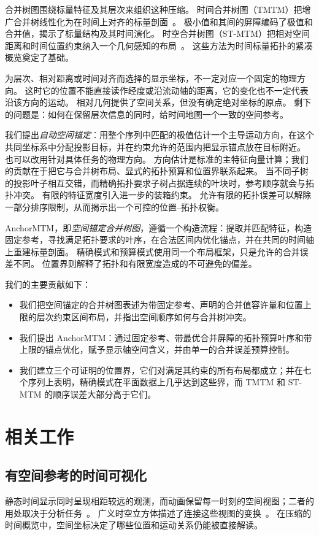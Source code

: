 \documentclass[fontset=none,zihao=5,a4paper]{ctexart}
\begin{document}
合并树图围绕标量特征及其层次来组织这种压缩。
时间合并树图（TMTM）把增广合并树线性化为在时间上对齐的标量剖面~\cite{Koepp:2023:TMTM}。
极小值和其间的屏障编码了极值和合并值，揭示了标量结构及其时间演化。
时空合并树图（ST-MTM）把相对空间距离和时间位置约束纳入一个几何感知的布局~\cite{STMTM:2026}。
这些方法为时间标量拓扑的紧凑概览奠定了基础。

为层次、相对距离或时间对齐而选择的显示坐标，不一定对应一个固定的物理方向。
这时它的位置不能直接读作经度或沿流动轴的距离，它的变化也不一定代表沿该方向的运动。
相对几何提供了空间关系，但没有确定绝对坐标的原点。
剩下的问题是：如何在保留层次信息的同时，给时间地图一个一致的空间参考。

我们提出\emph{自动空间锚定}：用整个序列中匹配的极值估计一个主导运动方向，在这个共同坐标系中分配投影目标，并在约束允许的范围内把显示锚点放在目标附近。
也可以改用针对具体任务的物理方向。
方向估计是标准的主特征向量计算；我们的贡献在于把它与合并树布局、显式的拓扑预算和位置界联系起来。
当不同子树的投影叶子相互交错，而精确拓扑要求子树占据连续的叶块时，参考顺序就会与拓扑冲突。
有限的特征宽度引入进一步的装箱约束。
允许有限的拓扑误差可以解除一部分排序限制，从而揭示出一个可控的位置–拓扑权衡。

AnchorMTM，即\emph{空间锚定合并树图}，遵循一个构造流程：提取并匹配特征，构造固定参考，寻找满足拓扑要求的叶序，在合法区间内优化锚点，并在共同的时间轴上重建标量剖面。
精确模式和预算模式使用同一个布局框架，只是允许的合并误差不同。
位置界则解释了拓扑和有限宽度造成的不可避免的偏差。

我们的主要贡献如下：
\begin{itemize}
\item 我们把空间锚定的合并树图表述为带固定参考、声明的合并值容许量和位置上限的层次约束区间布局，并指出空间顺序如何与合并树冲突。
\item 我们提出 AnchorMTM：通过固定参考、带最优合并屏障的拓扑预算叶序和带上限的锚点优化，赋予显示轴空间含义，并由单一的合并误差预算控制。
\item 我们建立三个可证明的位置界，它们对满足其约束的所有布局都成立；并在七个序列上表明，精确模式在平面数据上几乎达到这些界，而 TMTM 和 ST-MTM 的顺序误差大部分高于它们。
\end{itemize}

\section{相关工作}\label{sec:related}
\subsection{有空间参考的时间可视化}
静态时间显示同时呈现相距较远的观测，而动画保留每一时刻的空间视图；二者的用处取决于分析任务~\cite{Tversky:2002:Animation,Robertson:2008:Animation}。
广义时空立方体描述了连接这些视图的变换~\cite{Bach:2017:STC}。
在压缩的时间概览中，空间坐标决定了哪些位置和运动关系仍能被直接解读。
\end{document}
